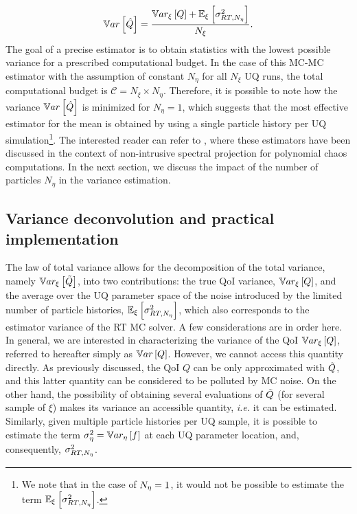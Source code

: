 \begin{equation}
	\label{kbc:eq:variance}
 	\mathbb{V}ar\left[ \hat{Q} \right] = \frac{\mathbb{V}ar_{\xi}\left[ Q \right] +  \mathbb{E}_\xi\left[ \sigma^2_{RT,N_\eta} \right]}{N_\xi}.
\end{equation} 
The goal of a precise estimator is to obtain statistics with the lowest possible variance for a prescribed computational budget. In the case of this MC-MC estimator with the assumption of constant $N_\eta$ for all $N_\xi$ UQ runs, the total computational budget is $\mathcal{C} = N_\xi \times N_\eta$. Therefore, it is possible to note how the variance $\mathbb{V}ar\left[\hat{Q}\right]$ is minimized for $N_\eta=1$, which suggests that the most effective estimator for the mean is obtained by using a single particle history per UQ simulation\footnote{We note that in the case of $N_\eta=1$, it would not be possible to estimate the term $\mathbb{E}_\xi\left[ \sigma^2_{RT,N_\eta} \right]$.}. The interested reader can refer to \cite{kbc:GeraciANS21}, where these estimators have been discussed in the context of non-intrusive spectral projection for polynomial chaos computations. In the next section, we discuss the impact of the number of particles $N_\eta$ in the variance estimation.


\subsection{Variance deconvolution and practical implementation}
The law of total variance allows for the decomposition of the total variance, namely $\mathbb{V}ar_{\xi}\left[\tilde{Q}\right]$, into two contributions: the true QoI variance, $\mathbb{V}ar_{\xi}\left[Q\right]$, and the average over the UQ parameter space of the noise introduced by the limited number of particle histories, $\mathbb{E}_\xi\left[ \sigma^2_{RT,N_\eta} \right]$, which also corresponds to the estimator variance of the RT MC solver. A few considerations are in order here. In general, we are interested in characterizing the variance of the QoI $\mathbb{V}ar_{\xi}\left[Q\right]$, referred to hereafter simply as $\mathbb{V}ar\left[Q\right]$. However, we cannot access this quantity directly. As previously discussed, the QoI $Q$ can be only approximated with $\tilde{Q}$, and this latter quantity can be considered to be polluted by MC noise. On the other hand, the possibility of obtaining several evaluations of $\tilde{Q}$ (for several sample of $\xi$) makes its variance an accessible quantity, \textit{i.e.} it can be estimated. Similarly, given multiple particle histories per UQ sample, it is possible to estimate the term $\sigma^2_\eta = \mathbb{V}ar_{\eta}\left[f\right]$ at each UQ parameter location, and, consequently, $\sigma^2_{RT,N_\eta}$.

